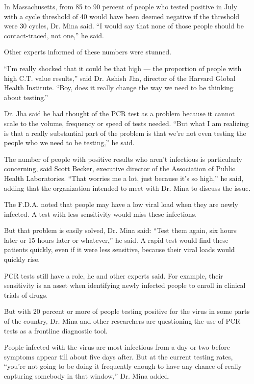 In Massachusetts, from 85 to 90 percent of people who tested positive in
July with a cycle threshold of 40 would have been deemed negative if the
threshold were 30 cycles, Dr. Mina said. ``I would say that none of
those people should be contact-traced, not one,'' he said.

Other experts informed of these numbers were stunned.

``I'm really shocked that it could be that high --- the proportion of
people with high C.T. value results,'' said Dr. Ashish Jha, director of
the Harvard Global Health Institute. ``Boy, does it really change the
way we need to be thinking about testing.''

Dr. Jha said he had thought of the PCR test as a problem because it
cannot scale to the volume, frequency or speed of tests needed. ``But
what I am realizing is that a really substantial part of the problem is
that we're not even testing the people who we need to be testing,'' he
said.

The number of people with positive results who aren't infectious is
particularly concerning, said Scott Becker, executive director of the
Association of Public Health Laboratories. ``That worries me a lot, just
because it's so high,'' he said, adding that the organization intended
to meet with Dr. Mina to discuss the issue.

The F.D.A. noted that people may have a low viral load when they are
newly infected. A test with less sensitivity would miss these
infections.

But that problem is easily solved, Dr. Mina said: ``Test them again, six
hours later or 15 hours later or whatever,'' he said. A rapid test would
find these patients quickly, even if it were less sensitive, because
their viral loads would quickly rise.

PCR tests still have a role, he and other experts said. For example,
their sensitivity is an asset when identifying newly infected people to
enroll in clinical trials of drugs.

But with 20 percent or more of people testing positive for the virus in
some parts of the country, Dr. Mina and other researchers are
questioning the use of PCR tests as a frontline diagnostic tool.

People infected with the virus are most infectious from a day or two
before symptoms appear till about five days after. But at the current
testing rates, ``you're not going to be doing it frequently enough to
have any chance of really capturing somebody in that window,'' Dr. Mina
added.

